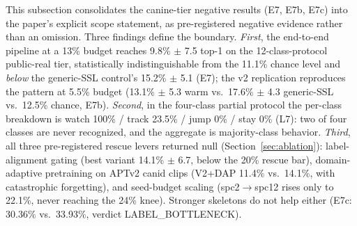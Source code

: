 This subsection consolidates the canine-tier negative results (E7, E7b, E7c) into the paper's explicit scope statement, as pre-registered negative evidence rather than an omission. Three findings define the boundary. \emph{First}, the end-to-end pipeline at a 13\% budget reaches 9.8\% $\pm$ 7.5 top-1 on the 12-class-protocol public-real tier, statistically indistinguishable from the 11.1\% chance level and \emph{below} the generic-SSL control's 15.2\% $\pm$ 5.1 (E7); the v2 replication reproduces the pattern at 5.5\% budget (13.1\% $\pm$ 5.3 warm vs.\ 17.6\% $\pm$ 4.3 generic-SSL vs.\ 12.5\% chance, E7b). \emph{Second}, in the four-class partial protocol the per-class breakdown is watch 100\% / track 23.5\% / jump 0\% / stay 0\% (L7): two of four classes are never recognized, and the aggregate is majority-class behavior. \emph{Third}, all three pre-registered rescue levers returned null (Section~\ref{sec:ablation}): label-alignment gating (best variant 14.1\% $\pm$ 6.7, below the 20\% rescue bar), domain-adaptive pretraining on APTv2 canid clips (V2+DAP 11.4\% vs.\ 14.1\%, with catastrophic forgetting), and seed-budget scaling (spc2$\to$spc12 rises only to 22.1\%, never reaching the 24\% knee). Stronger skeletons do not help either (E7c: 30.36\% vs.\ 33.93\%, verdict LABEL\_BOTTLENECK).

